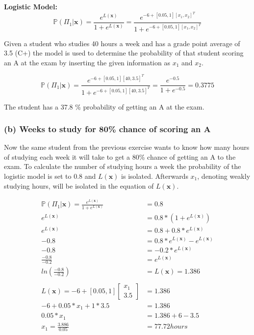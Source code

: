 \textbf{Logistic Model:}
\begin{equation*}
\mathbb{P}(\Pi_1 | \textbf{x}) = \frac{e^{L(\textbf{x})}}{1+e^{L(\textbf{x})}} = \frac{e^{-6+[0.05,1][x_1, x_2]^T}}{1+e^{-6+[0.05,1][x_1,x_2]^T}}    
\end{equation*}

Given a student who studies 40 hours a week and has a grade point average of 3.5 (C+) the model is used to determine the probability of that student scoring an A at the exam by inserting the given information as $x_1$ and $x_2$.

\begin{equation}
\mathbb{P}(\Pi_1 | \textbf{x}) =  \frac{e^{-6+[0.05,1][40,3.5]^T}}{1+e^{-6+[0.05,1][40,3.5]^T}} =
\frac{e^{-0.5}}{1+e^{-0.5}} = 0.3775     
\end{equation}

The student has a 37.8 \% probability of getting an A at the exam.

\subsubsection*{(b) Weeks to study for 80\% chance of scoring an A}

Now the same student from the previous exercise wants to know how many hours of studying each week it will take to get a 80\% chance of getting an A to the exam.
To calculate the number of studying hours a week the probability of the logistic model is set to 0.8 and $L(\textbf{x})$ is isolated. Afterwards $x_1$, denoting weakly studying hours, will be isolated in the equation of $L(\textbf{x})$. 

\begin{align*}
\mathbb{P}(\Pi_1 | \textbf{x}) = \frac{e^{L(\textbf{x})}}{1+e^{L(\textbf{x})}} &= 0.8 \\
e^{L(\textbf{x})} &= 0.8*(1+e^{L(\textbf{x})}) \\
e^{L(\textbf{x})} &= 0.8 + 0.8*e^{L(\textbf{x})} \\
-0.8 &= 0.8*e^{L(\textbf{x})} - e^{L(\textbf{x})} \\ 
-0.8 &= -0.2*e^{L(\textbf{x})} \\
\frac{-0.8}{-0.2} &= e^{L(\textbf{x})} \\
ln(\frac{-0.8}{-0.2}) &= L(\textbf{x}) = 1.386 \\
& \\
L(\textbf{x}) = -6+[0.05,1]\begin{bmatrix}x_1 \\ 3.5\end{bmatrix}&=1.386 \\
-6+0.05*x_1+1*3.5&=1.386\\
0.05*x_1&=1.386+6-3.5\\
x_1=\frac{3.886}{0.05}&=77.72 hours \\
\end{align*}

